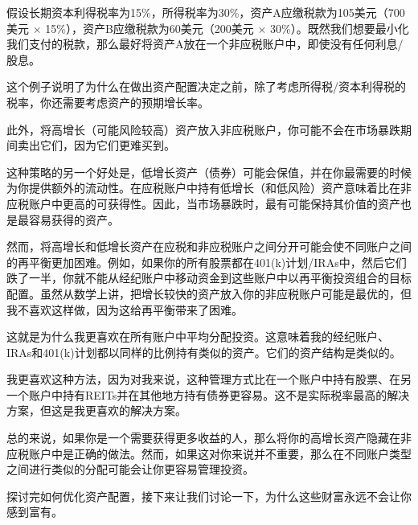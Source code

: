 假设长期资本利得税率为15\%，所得税率为30\%，资产A应缴税款为105美元（700美元 $\times$ 15\%），资产B应缴税款为60美元（200美元 $\times$ 30\%）。既然我们想要最小化我们支付的税款，那么最好将资产A放在一个非应税账户中，即使没有任何利息/股息。

这个例子说明了为什么在做出资产配置决定之前，除了考虑所得税/资本利得税的税率，你还需要考虑资产的预期增长率。

此外，将高增长（可能风险较高）资产放入非应税账户，你可能不会在市场暴跌期间卖出它们，因为它们更难买到。

这种策略的另一个好处是，低增长资产（债券）可能会保值，并在你最需要的时候为你提供额外的流动性。在应税账户中持有低增长（和低风险）资产意味着比在非应税账户中更高的可获得性。因此，当市场暴跌时，最有可能保持其价值的资产也是最容易获得的资产。

然而，将高增长和低增长资产在应税和非应税账户之间分开可能会使不同账户之间的再平衡更加困难。例如，如果你的所有股票都在401(k)计划/IRAs中，然后它们跌了一半，你就不能从经纪账户中移动资金到这些账户中以再平衡投资组合的目标配置。虽然从数学上讲，把增长较快的资产放入你的非应税账户可能是最优的，但我不喜欢这样做，因为这给再平衡带来了困难。

这就是为什么我更喜欢在所有账户中平均分配投资。这意味着我的经纪账户、IRAs和401(k)计划都以同样的比例持有类似的资产。它们的资产结构是类似的。

我更喜欢这种方法，因为对我来说，这种管理方式比在一个账户中持有股票、在另一个账户中持有REITs并在其他地方持有债券更容易。这不是实际税率最高的解决方案，但这是我更喜欢的解决方案。

总的来说，如果你是一个需要获得更多收益的人，那么将你的高增长资产隐藏在非应税账户中是正确的做法。然而，如果这对你来说并不重要，那么在不同账户类型之间进行类似的分配可能会让你更容易管理投资。

探讨完如何优化资产配置，接下来让我们讨论一下，为什么这些财富永远不会让你感到富有。

